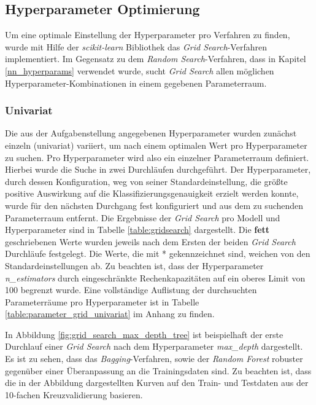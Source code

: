 \subsection{Hyperparameter Optimierung}
Um eine optimale Einstellung der Hyperparameter pro Verfahren zu finden, wurde mit Hilfe der \emph{scikit-learn} Bibliothek das \emph{Grid Search}-Verfahren implementiert. Im Gegensatz zu dem \emph{Random Search}-Verfahren, dass in Kapitel \ref{nn_hyperparams} verwendet wurde, sucht \emph{Grid Search} allen möglichen Hyperparameter-Kombinationen in einem gegebenen Parameterraum. 

\subsubsection{Univariat}
\label{section:univariat}
Die aus der Aufgabenstellung angegebenen Hyperparameter wurden zunächst einzeln (univariat) variiert, um nach einem optimalen Wert pro Hyperparameter zu suchen. Pro Hyperparameter wird also ein einzelner Parameterraum definiert. Hierbei wurde die Suche in zwei Durchläufen durchgeführt. Der Hyperparameter, durch dessen Konfiguration, weg von seiner Standardeinstellung, die größte positive Auswirkung auf die Klassifizierungsgenauigkeit erzielt werden konnte, wurde für den  nächsten Durchgang fest konfiguriert und aus dem zu suchenden Parameterraum entfernt. Die Ergebnisse der \emph{Grid Search} pro Modell und Hyperparameter sind in Tabelle \ref{table:gridsearch} dargestellt. Die \textbf{fett} geschriebenen Werte wurden jeweils nach dem Ersten der beiden \emph{Grid Search} Durchläufe festgelegt. Die Werte, die mit * gekennzeichnet sind, weichen von den Standardeinstellungen ab. Zu beachten ist, dass der Hyperparameter \emph{n\_estimators} durch eingeschränkte Rechenkapazitäten auf ein oberes Limit von 100 begrenzt wurde. Eine vollständige Auflistung der durchsuchten Parameterräume pro Hyperparameter ist in Tabelle \ref{table:parameter_grid_univariat} im Anhang zu finden.

In Abbildung \ref{fig:grid_search_max_depth_tree} ist  beispielhaft der erste Durchlauf einer \emph{Grid Search} nach dem Hyperparameter \emph{max\_depth} dargestellt. Es ist zu sehen, dass das \emph{Bagging}-Verfahren, sowie der \emph{Random Forest} robuster gegenüber einer Überanpassung an die Trainingsdaten sind. Zu beachten ist, dass die in der Abbildung dargestellten Kurven auf den Train- und Testdaten aus der 10-fachen Kreuzvalidierung basieren. 

